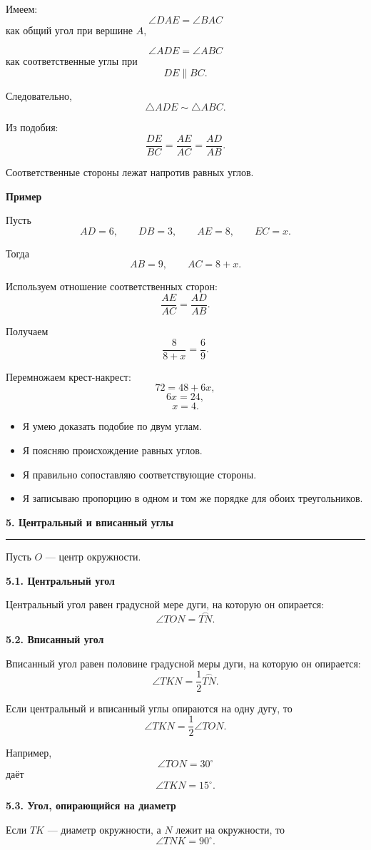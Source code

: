 \documentclass[a4paper,12pt]{article}
\newcommand{\topic}[1]{%
  \vspace{0.4em}
  {\Large\bfseries\color{darkaccent}#1\par}
  \vspace{0.25em}
  {\color{accent}\rule{\linewidth}{0.7pt}}
  \vspace{0.45em}
}
\newcommand{\subtopic}[1]{%
  \vspace{0.5em}
  {\large\bfseries\color{darkaccent}#1\par}
  \vspace{0.2em}
}
\newcommand{\checkliststart}{%
  \begin{itemize}[label={\(\square\)},leftmargin=8mm]
}
\newcommand{\checklistend}{\end{itemize}}
\begin{document}
Имеем:
\[
\angle DAE=\angle BAC
\]
как общий угол при вершине \(A\),

\[
\angle ADE=\angle ABC
\]
как соответственные углы при
\[
DE\parallel BC.
\]

Следовательно,
\[
\triangle ADE\sim\triangle ABC.
\]

Из подобия:
\[
\boxed{
\frac{DE}{BC}
=
\frac{AE}{AC}
=
\frac{AD}{AB}
}.
\]

Соответственные стороны лежат напротив равных углов.

\subtopic{Пример}

Пусть
\[
AD=6,\qquad DB=3,\qquad AE=8,\qquad EC=x.
\]

Тогда
\[
AB=9,\qquad AC=8+x.
\]

Используем отношение соответственных сторон:
\[
\frac{AE}{AC}
=
\frac{AD}{AB}.
\]

Получаем
\[
\frac8{8+x}=\frac69.
\]

Перемножаем крест-накрест:
\[
72=48+6x,
\]
\[
6x=24,
\]
\[
\boxed{x=4}.
\]

\checkliststart
\item Я умею доказать подобие по двум углам.
\item Я поясняю происхождение равных углов.
\item Я правильно сопоставляю соответствующие стороны.
\item Я записываю пропорцию в одном и том же порядке для обоих треугольников.
\checklistend

\topic{5. Центральный и вписанный углы}

Пусть \(O\) --- центр окружности.

\subtopic{5.1. Центральный угол}

Центральный угол равен градусной мере дуги, на которую он опирается:
\[
\angle TON=\overset{\frown}{TN}.
\]

\subtopic{5.2. Вписанный угол}

Вписанный угол равен половине градусной меры дуги, на которую он опирается:
\[
\angle TKN
=
\frac12\overset{\frown}{TN}.
\]

Если центральный и вписанный углы опираются на одну дугу, то
\[
\boxed{
\angle TKN=\frac12\angle TON
}.
\]

Например,
\[
\angle TON=30^\circ
\]
даёт
\[
\angle TKN=15^\circ.
\]

\subtopic{5.3. Угол, опирающийся на диаметр}

Если \(TK\) --- диаметр окружности, а \(N\) лежит на окружности, то
\[
\angle TNK=90^\circ.
\]
\end{document}
